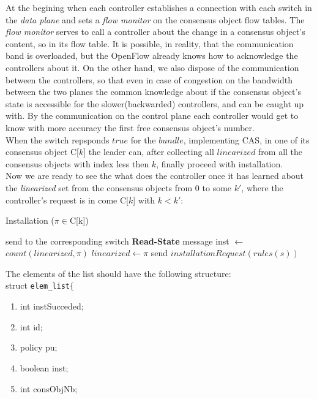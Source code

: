 \documentclass{article}
\begin{document}
%
At the begining when each controller establishes a connection with each switch in the \emph{data plane} and sets a \emph{flow monitor} on the consensus object flow tables. The \emph{flow monitor} serves to call a controller about the change in a consensus object's content, so in its flow table. It is possible, in reality, that the communication band is overloaded, but the OpenFlow already knows how to acknowledge the controllers about it. On the other hand, we also dispose of the communication between the controllers, so that even in case of congestion on the bandwidth between the two planes the common knowledge about if the consensus object's state is accessible for the slower(backwarded) controllers, and can be caught up with.
By the communication on the control plane each controller would get to know with more accuracy the first free consensus object's number.
\\ 
When  the switch repsponds $true$ for the $bundle$, implementing CAS, in one of its  consensus object C[$k$] the leader can, after collecting all $linearized$ from all the consensus objects with index less then $k$, finally proceed with installation.\\
Now we are ready to see the what does the controller once it has learned about the \emph{linearized} set from the consensus objects from 0 to some $k'$, where the controller's request is in come C[$k$] with $k<k'$:
\begin{algorithm}
 \caption{Installation ($\pi\in$C[k])}
 \begin{algorithmic}[1]
 	\State send to the corresponding switch \textbf{Read-State} message
 \EndFor
 \State inst $\gets$ $count(linearized, \pi)$
 	\State $linearized\gets \pi$
 	  send $installationRequest(rules(s))$
 	\EndFor
 \EndIf
 \end{algorithmic}
\end{algorithm}
The elements of the list should have the following structure:\\
struct \texttt{elem\_list}$\lbrace$
\begin{enumerate}
\item int instSucceded;
\item int id;
\item policy pu;
\item boolean inst;
\item int consObjNb;
\end{enumerate}
\end{document}
